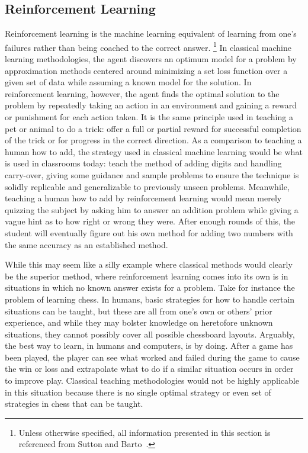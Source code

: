 \subsection{Reinforcement Learning}
\label{sec:intro-reinf}



Reinforcement learning is the machine learning equivalent of learning from one's
failures
rather than being coached to the correct answer.%
\footnote{
	Unless otherwise specified,
	all information presented in this section is referenced from
	Sutton and Barto~\cite{rl_book}.
}
%
In classical machine learning methodologies,
the agent discovers an optimum model for a problem by approximation methods
centered around minimizing a set loss function over a given set of data
while assuming a known model for the solution.
%
In reinforcement learning,
however,
the agent finds the optimal solution to the problem by repeatedly taking an
action in an environment and gaining a reward or punishment for each
action taken.
%
It is the same principle used in teaching a pet or animal to do a trick:
offer a full or partial reward for successful completion of the trick or
for progress in the correct direction.
%
As a comparison to teaching a human how to add,
the strategy used in classical machine learning would be what is used in
classrooms today:
teach the method of adding digits and handling carry-over,
giving some guidance and sample problems to ensure the technique is solidly
replicable and generalizable to previously unseen problems.
%
Meanwhile, teaching a human how to add by reinforcement learning would
mean merely quizzing the subject by asking him to answer an addition problem
while giving a vague hint as to how right or wrong they were.
%
After enough rounds of this,
the student will eventually figure out his own method for adding two numbers
with the same accuracy as an established method.

While this may seem like a silly example where classical methods would clearly
be the superior method,
where reinforcement learning comes into its own is in situations in which no
known answer exists for a problem.
%
Take for instance the problem of learning chess.
%
In humans,
basic strategies for how to handle certain situations can be taught,
but these are all from one's own or others' prior experience,
and while they may bolster knowledge on heretofore unknown situations,
they cannot possibly cover all possible chessboard layouts.
%
Arguably, the best way to learn, in humans and computers, is by doing.
%
%
After a game has been played,
the player can see what worked and failed during the game to cause the win or
loss and extrapolate what to do if a similar situation occurs in order to
improve play.
%
Classical teaching methodologies would not be highly applicable in this
situation because there is no single optimal strategy
or even set of strategies
in chess that can be taught.





